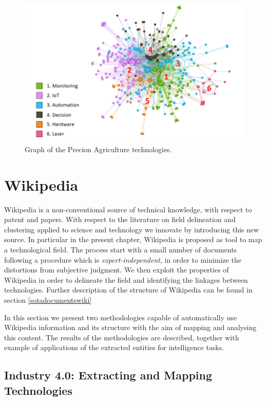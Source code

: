 \documentclass[]{book}
\theoremstyle{definition}
\theoremstyle{definition}
\theoremstyle{definition}
\theoremstyle{remark}
\begin{document}
\begin{figure}

{\centering \includegraphics[width=0.8\linewidth]{_bookdown_files/figures/precisiongraph} 

}

\caption{Graph of the Precion Agriculture technologies.}\label{fig:precisiongraph}
\end{figure}

\chapter{Wikipedia}\label{wikipedia}

Wikipedia is a non-conventional source of technical knowledge, with
respect to patent and papers. With respect to the literature on field
delineation and clustering applied to science and technology we innovate
by introducing this new source. In particular in the present chapter,
Wikipedia is proposed as tool to map a technological field. The process
start with a small number of documents following a procedure which is
\emph{expert-independent}, in order to minimize the distortions from
subjective judgment. We then exploit the properties of Wikipedia in
order to delineate the field and identifying the linkages between
technologies. Further description of the structure of Wikipedia can be
found in section \ref{sotadocumentswiki}

In this section we present two methodologies capable of automatically
use Wikipedia information and its structure with the aim of mapping and
analysing this content. The results of the methodologies are described,
together with example of applications of the extracted entities for
intelligence tasks.

\section{Industry 4.0: Extracting and Mapping
Technologies}\label{technimetrochap}
\end{document}
